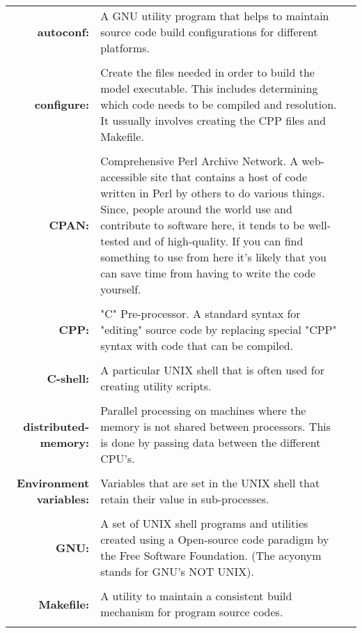 \documentclass[]{article}
\begin{document}
\begin{tabular}{r p{3.3in} p{4in}}

{\bf autoconf:} & A GNU utility program that helps to maintain source code build configurations
for different platforms. \\ \\

{\bf configure:} & Create the files needed in order to build the model executable. This
includes determining which code needs to be compiled and resolution. It ussually involves
creating the CPP files and Makefile. \\ \\

{\bf CPAN:} & Comprehensive Perl Archive Network. A web-accessible site that contains
a host of code written in Perl by others to do various things. Since, people around the
world use and contribute to software here, it tends to be well-tested and of high-quality.
If you can find something to use from here it's likely that you can save time from having
to write the code yourself. \\ \\

{\bf CPP:} & "C" Pre-processor. A standard syntax for "editing" source code
by replacing special "CPP" syntax with code that can be compiled.  \\ \\

{\bf C-shell:} & A particular UNIX shell that is often used for creating utility scripts. \\ \\

{\bf distributed-memory:} & Parallel processing on machines where the memory is not
shared between processors. This is done by passing data between the different CPU's. \\ \\

{\bf Environment variables:} & Variables that are set in the UNIX shell that retain
their value in sub-processes. \\ \\

{\bf GNU:} & A set of UNIX shell programs and utilities created using a Open-source
code paradigm by the Free Software Foundation. (The acyonym stands for GNU's NOT UNIX). \\ \\

{\bf Makefile:} & A utility to maintain a consistent build mechanism for program
source codes. \\ \\


\end{tabular}
\end{document}
